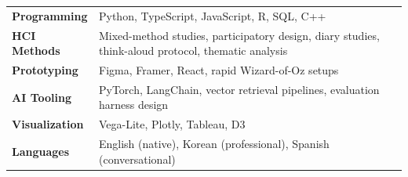 %
%
%

\begin{longtable}{@{}p{}p{}}
\textbf{Programming} & Python, TypeScript, JavaScript, R, SQL, C++ \\
\textbf{HCI Methods} & Mixed-method studies, participatory design, diary studies, think-aloud protocol, thematic analysis \\
\textbf{Prototyping} & Figma, Framer, React, rapid Wizard-of-Oz setups \\
\textbf{AI Tooling} & PyTorch, LangChain, vector retrieval pipelines, evaluation harness design \\
\textbf{Visualization} & Vega-Lite, Plotly, Tableau, D3 \\
\textbf{Languages} & English (native), Korean (professional), Spanish (conversational) \\
\end{longtable}